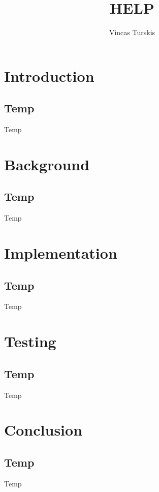 \documentclass[11pt,a4paper]{report}
\author{Vincas Turskis}
\title{HELP}
\begin{document}
\tableofcontents
\chapter{Introduction}
\section{Temp}
Temp

\chapter{Background}
\section{Temp}
Temp



\chapter{Implementation}
\section{Temp}
Temp

\chapter{Testing}
\section{Temp}
Temp

\chapter{Conclusion}
\section{Temp}
Temp
\end{document}
